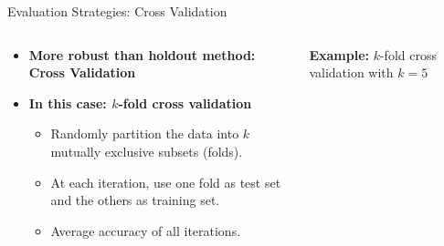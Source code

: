 \begin{frame}{Evaluation Strategies: Cross Validation}
	\begin{columns}[T]
		\begin{column}[T]{0.45\textwidth}
			\begin{itemize}
				\item \textbf{More robust than holdout method: {\color{airforceblue} Cross Validation}}
				\item \textbf{In this case: {\color{airforceblue} $k$-fold cross validation}}
				      \begin{itemize}
					      \item Randomly partition the data into $k$ mutually exclusive subsets (folds).
					      \item At each iteration, use one fold as test set and the others as training set.
					      \item Average accuracy of all iterations.
				      \end{itemize}
			\end{itemize}

		\end{column}

		\begin{column}[T]{0.45\textwidth}
			\centering
			\vspace{.3em}
			\textbf{Example:} $k$-fold cross validation with $k=5$\\\medskip


\end{column}
\end{columns}
\end{frame}
